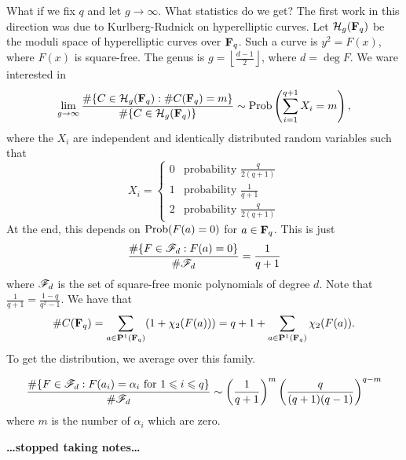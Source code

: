 What if we fix $q$ and let $g\to \infty$. What statistics do we get? The 
first work in this direction was due to Kurlberg-Rudnick on hyperelliptic 
curves. Let $\mathcal{H}_g(\mathbf{F}_q)$ be the moduli space of hyperelliptic curves over 
$\mathbf{F}_q$. Such a curve is $y^2=F(x)$, where $F(x)$ is square-free. The genus 
is $g=\left\lfloor\frac{d-1}{2}\right\rfloor$, where $d=\deg F$. We ware 
interested in 
\[
  \lim_{g\to \infty} \frac{\#\{C\in \mathcal{H}_g(\mathbf{F}_q):\# C(\mathbf{F}_q)=m\}}{\#\{C\in \mathcal{H}_g(\mathbf{F}_q)\}} \sim \operatorname{Prob}\left(\sum_{i=1}^{q+1} X_i = m\right) ,
\]
where the $X_i$ are independent and identically distributed random variables 
such that 
\[
  X_i = \begin{cases} 0 & \text{probability }\frac{q}{2(q+1)} \\ 1 & \text{probability } \frac{1}{q+1} \\ 2 & \text{probability }\frac{q}{2(q+1)} \end{cases}
\]
At the end, this depends on $\operatorname{Prob}(F(a)=0)$ for $a\in \mathbf{F}_q$. This is just 
\[
  \frac{\#\{F\in \mathscr{F}_d:F(a)=0\}}{\#\mathscr{F}_d} = \frac{1}{q+1} 
\]
where $\mathscr{F}_d$ is the set of square-free monic polynomials of degree $d$. Note 
that $\frac{1}{q+1} = \frac{1-q}{q^2-1}$. We have that 
\[
  \# C(\mathbf{F}_q) = \sum_{a\in \mathbf{P}^1(\mathbf{F}_q)} (1+\chi_2(F(a))) = q+1+\sum_{a\in \mathbf{P}^1(\mathbf{F}_q)} \chi_2(F(a)) .
\]
To get the distribution, we average over this family. 

\begin{theorem}
\[
  \frac{\#\{F\in\mathscr{F}_d:F(a_i)=\alpha_i\text{ for }1\leqslant i\leqslant q\}}{\# \mathscr{F}_d} \sim \left(\frac{1}{q+1}\right)^m \left(\frac{q}{(q+1)(q-1)}\right)^{q-m} 
\]
where $m$ is the number of $\alpha_i$ which are zero. 
\end{theorem}

\textbf{\ldots stopped taking notes\ldots}





